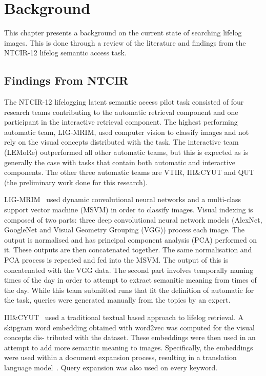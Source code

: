 \chapter{Background}

This chapter presents a background on the current state of searching lifelog images. This is done through a review of the literature and findings from the NTCIR-12 lifelog semantic access task.



\section{Findings From NTCIR}
The NTCIR-12 lifelogging latent semantic access pilot task consisted of four research teams contributing to the automatic retrieval component and one participant in the interactive retrieval component. The highest performing automatic team, LIG-MRIM, used computer vision to classify images and not rely on the visual concepts distributed with the task. The interactive team (LEMoRe) outperformed all other automatic teams, but this is expected as is generally the case with tasks that contain both automatic and interactive components. The other three automatic teams are VTIR, III\&CYUT and QUT (the preliminary work done for this research).

LIG-MRIM~\cite{safadilig2016ligmrim} used dynamic convolutional neural networks and a multi-class support vector machine (MSVM) in order to classify images. Visual indexing is composed of two parts: three deep convolutional neural network models (AlexNet, GoogleNet and Visual Geometry Grouping (VGG)) process each image. The output is normalised and has principal component analysis (PCA) performed on it. These outputs are then concatenated together. The same normalisation and PCA process is repeated and fed into the MSVM. The output of this is concatenated with the VGG data. The second part involves temporally naming times of the day in order to attempt to extract semanitic meaning from times of the day. While this team submitted runs that fit the definition of automatic for the task, queries were generated manually from the topics by an expert.

III\&CYUT~\cite{lin2016image} used a traditional textual based approach to lifelog retrieval. A skipgram word embedding obtained with word2vec\cite{mikolov2013word2vec} was computed for the visual concepts dis- tributed with the dataset. These embeddings were then used in an attempt to add more semantic meaning to images. Specifically, the embeddings were used within a document expansion process, resulting in a translation language model~\cite{zuccon2015integrating}. Query expansion was also used on every keyword.

